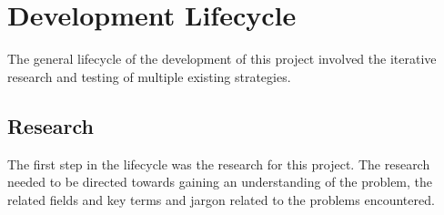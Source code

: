 \documentclass[a4paper, 12pt]{report}
\begin{document}





\newpage

\section{Development Lifecycle}
The general lifecycle of the development of this project involved the iterative research and testing of multiple existing strategies.

\subsection{Research}
The first step in the lifecycle was the research for this project. The research needed to be directed towards gaining an understanding of the problem, the related fields and key terms and jargon related to the problems encountered.
\end{document}
